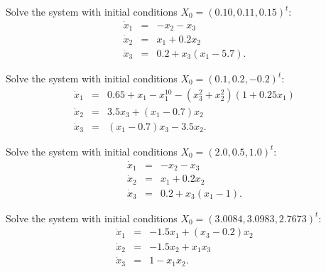 \documentclass{ximera}
\begin{document}
\begin{exercise}  \label{c11.6.1e}             
Solve the system  with initial conditions 
$X_0 = (0.10, 0.11, 0.15)^t$:
\begin{equation*} \label{e11.6.1e}
\begin{array}{rcl} 
\dot{x}_1 & = & -x_2-x_3  \\
\dot{x}_2 & = &  x_1 + 0.2x_2 \\
\dot{x}_3 & = & 0.2 + x_3(x_1 - 5.7). \end{array}
\end{equation*}
\end{exercise}

\begin{exercise}  \label{c11.6.1g} 
Solve the system  with initial conditions 
$X_0 = (0.1,0.2, -0.2)^t$:
\begin{equation*} \label{e11.6.1g}
\begin{array}{rcl} 
\dot{x}_1 & = & 0.65 + x_1 - x_1^{10} - (x_3^2 + x_2^2)(1 + 0.25x_1)  \\
\dot{x}_2 & = & 3.5x_3 + (x_1 - 0.7)x_2  \\
\dot{x}_3 & = & (x_1 - 0.7)x_3 - 3.5x_2.
\end{array}
\end{equation*}
\end{exercise}

\begin{exercise}  \label{c11.6.1f}
Solve the system  with initial conditions 
$X_0 = (2.0, 0.5, 1.0)^t$:
\begin{equation*} \label{e11.6.1f}
\begin{array}{rcl} 
\dot{x}_1 & = & -x_2-x_3  \\
\dot{x}_2 & = &  x_1 + 0.2x_2 \\
\dot{x}_3 & = & 0.2 + x_3(x_1 - 1). \end{array}
\end{equation*}
\end{exercise}

\begin{exercise}  \label{c11.6.1h} 
Solve the system  with initial conditions 
$X_0 = (3.0084, 3.0983, 2.7673)^t$: 
\begin{equation*} \label{e11.6.1h}
\begin{array}{rcl} 
\dot{x}_1 & = &  -1.5x_1 + (x_3-0.2)x_2 \\
\dot{x}_2 & = &  -1.5x_2 + x_1x_3\\
\dot{x}_3 & = &  1 - x_1x_2.
\end{array}
\end{equation*}
\end{exercise}
\end{document}
